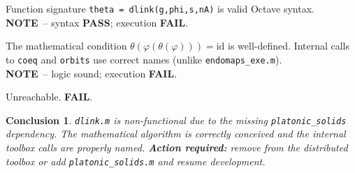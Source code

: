 \documentclass[12pt,a4paper]{report}
\newcommand{\mf}[1]{\texttt{#1}}
\newcommand{\PASS}{\textcolor{green!60!black}{\textbf{PASS}}}
\newcommand{\FAIL}{\textcolor{red!70!black}{\textbf{FAIL}}}
\newcommand{\NOTE}{\textcolor{orange!80!black}{\textbf{NOTE}}}
\newtheorem{concl}{Conclusion}[chapter]
\begin{document}
\begin{tcolorbox}[Pbox,title=TC2 -- Syntactic validity]
Function signature \lstinline|theta = dlink(g,phi,s,nA)| is valid Octave syntax.\\
\NOTE\ -- syntax \PASS; execution \FAIL.
\end{tcolorbox}
\begin{tcolorbox}[Pbox,title=TC3--TC4 -- Algorithm and internal calls]
The mathematical condition $\theta(\varphi(\theta(\varphi)))=\mathrm{id}$ is well-defined. Internal calls to \mf{coeq} and \mf{orbits} use correct names (unlike \mf{endomaps\_exe.m}).\\
\NOTE\ -- logic sound; execution \FAIL.
\end{tcolorbox}
\begin{tcolorbox}[Fbox,title=TC5 -- Performance]
Unreachable. \FAIL.
\end{tcolorbox}
\begin{concl}
\mf{dlink.m} is non-functional due to the missing \mf{platonic\_solids} dependency. The mathematical algorithm is correctly conceived and the internal toolbox calls are properly named. \textbf{Action required:} remove from the distributed toolbox or add \mf{platonic\_solids.m} and resume development.
\end{concl}

\end{document}
